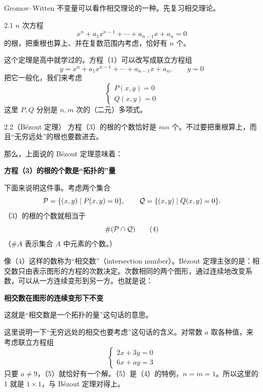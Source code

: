 Gromov--Witten 不变量可以看作相交理论的一种。先复习相交理论。

\begin{theorem*}{2.1}
$n$ 次方程
\begin{equation}
x^n + a_1 x^{n-1} + \cdots + a_{n-1} x + a_n = 0 \tag{1}
\end{equation}
的根，把重根也算上、并在复数范围内考虑，恰好有 $n$ 个。
\end{theorem*}

这个定理是高中就学过的。方程（1）可以改写成联立方程组
\begin{equation}
y = x^n + a_1 x^{n-1} + \cdots + a_{n-1} x + a_n, \qquad y = 0 \tag{2}
\end{equation}
把它一般化，我们来考虑
\begin{equation}
\begin{cases}
P(x,y) = 0 \\
Q(x,y) = 0
\end{cases} \tag{3}
\end{equation}
这里 $P,Q$ 分别是 $n,m$ 次的（二元）多项式。

\begin{theorem*}{2.2（Bézout 定理）}
方程（3）的根的个数恰好是 $mn$ 个。不过要把重根算上，而且“无穷远处”的根也要数进去。
\end{theorem*}

那么，上面说的 Bézout 定理意味着：

\begin{center}
\textbf{方程（3）的根的个数是“拓扑的”量}
\end{center}

下面来说明这件事。考虑两个集合
\[
\mathcal{P} = \{(x,y) \mid P(x,y) = 0\}, \qquad
\mathcal{Q} = \{(x,y) \mid Q(x,y) = 0\}.
\]
（3）的根的个数就相当于
\begin{equation}
\#(\mathcal{P} \cap \mathcal{Q}) \tag{4}
\end{equation}
（$\# A$ 表示集合 $A$ 中元素的个数。）

像（4）这样的数称为“相交数”（intersection number）。Bézout 定理主张的是：相交数只由表示图形的方程的次数决定。次数相同的两个图形，通过连续地改变系数，可以从一方连续变形到另一方。也就是说：

\begin{center}
\textbf{相交数在图形的连续变形下不变}
\end{center}

这就是“相交数是一个拓扑的量”这句话的意思。

这里说明一下“无穷远处的相交也要考虑”这句话的含义。对常数 $a$ 取各种值，来考虑联立方程组
\begin{equation}
\begin{cases}
2x + 3y = 0 \\
6x + ay = 3
\end{cases} \tag{5}
\end{equation}
只要 $a \neq 9$，（5）就恰好有一个解。（5）是（4）的特例，$n = m = 1$。所以这里的 1 就是 $1 \times 1$，与 Bézout 定理对得上。

